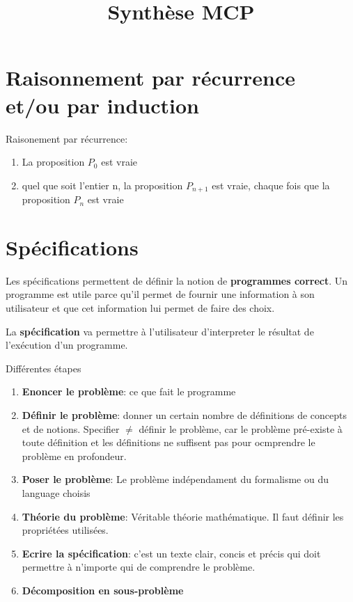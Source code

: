 \documentclass[11pt, a4paper]{article}
\title{Synthèse MCP}
\date{}
\author{}
\begin{document}
\maketitle
\section{Raisonnement par récurrence et/ou par induction}

Raisonement par récurrence:
\begin{enumerate}
\item La proposition $P_0$ est vraie
\item quel que soit l'entier n, la proposition $P_{n+1}$ est vraie, chaque fois que la proposition $P_n$ est vraie
\end{enumerate}

\section{Spécifications}

Les spécifications permettent de définir la notion de \textbf{programmes correct}. Un programme est utile parce qu'il permet de fournir une information à son utilisateur et que cet information lui permet de faire des choix.

La \textbf{spécification} va permettre à l'utilisateur d'interpreter le résultat de l'exécution d'un programme. 

Différentes étapes
\begin{enumerate}
\item \textbf{Enoncer le problème}: ce que fait le programme
\item \textbf{Définir le problème}: donner un certain nombre de définitions de concepts et de notions. Specifier $\neq$ définir le problème, car le problème pré-existe à toute définition et les définitions ne suffisent pas pour ocmprendre le problème en profondeur.
\item \textbf{Poser le problème}: Le problème indépendament du formalisme ou du language choisis
\item \textbf{Théorie du problème}: Véritable théorie mathématique. Il faut définir les propriétées utilisées. 
\item \textbf{Ecrire la spécification}: c'est un texte clair, concis et précis qui doit permettre à n'importe qui de comprendre le problème. 
\item \textbf{Décomposition en sous-problème}
\end{enumerate}
\end{document}

